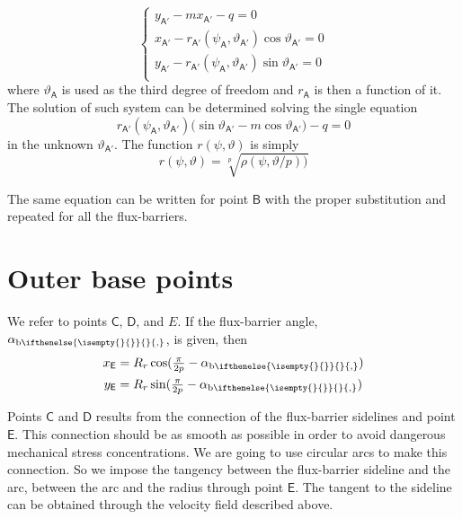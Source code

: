 \documentclass[b5paper,11pt,oneside,fleqn]{article}
\newcommand{\pt}[1]{\mathsf{#1}}
\newcommand{\te}{\vartheta}
\newcommand{\ab}[1][]{%
\alpha_{\textup{b}
\ifthenelse{\isempty{#1}{}}{}{,#1}%
}}
\newcommand{\pih}[1][]{\tfrac{\pi}{2#1}}
\begin{document}
\begin{equation}
\begin{cases}
y_\pt{A'} - m x_\pt{A'} - q = 0 \\
x_\pt{A'} - r_\pt{A'}(\psi_\pt{A},\te_\pt{A'}) \cos\te_\pt{A'} = 0 \\
y_\pt{A'} - r_\pt{A'}(\psi_\pt{A},\te_\pt{A'}) \sin\te_\pt{A'} = 0 \\
\end{cases}
\end{equation}
where $ \te_\pt{A} $ is used as the third degree of freedom and $ r_\pt{A} $ is 
then a function of it.
The solution of such system can be determined solving the single equation
\begin{equation}
r_\pt{A'}(\psi_\pt{A},\te_\pt{A'})
\bigl( \sin\te_\pt{A'} - m \cos\te_\pt{A'} \bigr) - q = 0
\end{equation}
in the unknown $ \te_\pt{A'} $.
The function $ r(\psi,\te) $ is simply 
\[
r(\psi,\te) = \sqrt[p]{ \rho(\psi,\te/p) \bigr) }
\]

The same equation can be written for point $ \pt{B} $ with the proper 
substitution and repeated for all the flux-barriers.



\section{Outer base points}
We refer to points $ \pt{C} $, $ \pt{D} $, and $ E $.
If the flux-barrier angle, $ \ab $, is given, then
\begin{equation}
\begin{aligned}
x_\pt{E} &= R_r \cos(\pih[p] - \ab) \\
y_\pt{E} &= R_r \sin(\pih[p] - \ab)
\end{aligned}
\end{equation}

Points $ \pt{C} $ and $ \pt{D} $ results from the connection of the 
flux-barrier sidelines and point $ \pt{E} $.
This connection should be as smooth as possible in order to 
avoid dangerous mechanical stress concentrations.
We are going to use circular arcs to make this connection.
So we impose the tangency between the flux-barrier sideline and the arc, 
between the arc and the radius through point $ \pt{E} $.
The tangent to the sideline can be obtained through the velocity field 
described above.
\end{document}
